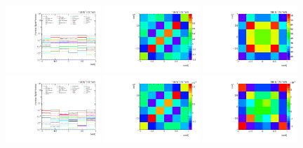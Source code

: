 \begin{figure}[htb]
\begin{center}
 \includegraphics[width=0.32\textwidth]{fig_fullRun2UL/unfolding/combined/deltaSystCombinedlog_rebinnedB_b2n.pdf}
 \includegraphics[width=0.32\textwidth]{fig_fullRun2UL/unfolding/combined/StatCovMatrix_rebinnedB_b2n.pdf}
 \includegraphics[width=0.32\textwidth]{fig_fullRun2UL/unfolding/combined/TotalSystCovMatrix_rebinnedB_b2n.pdf} \\
 \includegraphics[width=0.32\textwidth]{fig_fullRun2UL/unfolding/combined/deltaSystCombinedlogNorm_rebinnedB_b2n.pdf}
 \includegraphics[width=0.32\textwidth]{fig_fullRun2UL/unfolding/combined/StatCovMatrixNorm_rebinnedB_b2n.pdf}
 \includegraphics[width=0.32\textwidth]{fig_fullRun2UL/unfolding/combined/TotalSystCovMatrixNorm_rebinnedB_b2n.pdf} \\

\end{center}
\end{figure}
